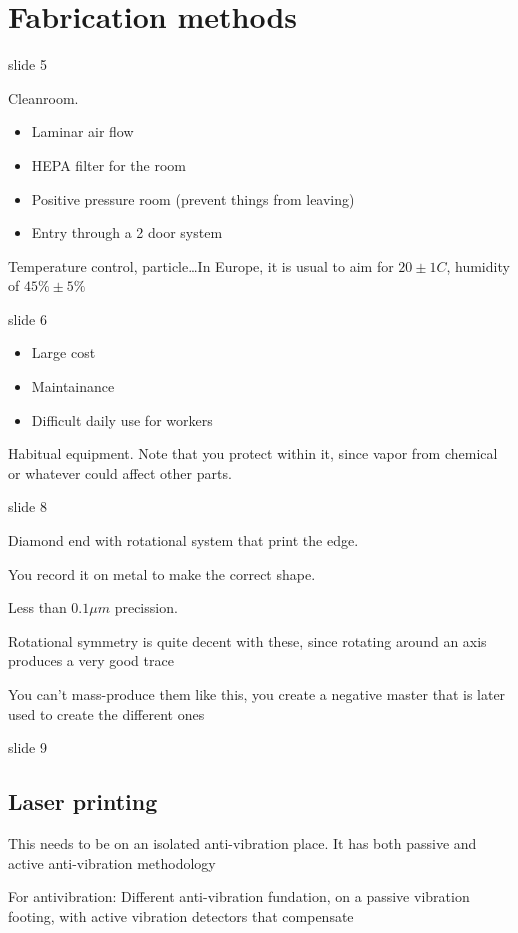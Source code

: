 \documentclass[../main/main.tex]{subfiles}
\begin{document}
\chapter{Fabrication methods}

slide 5

Cleanroom.

\begin{itemize}
	\item Laminar air flow
	\item HEPA filter for the room
	\item Positive pressure room (prevent things from leaving)
	\item Entry through a 2 door system
\end{itemize}

Temperature control, particle\ldots In Europe, it is usual to aim for $20\pm 1 C$, humidity of $45\%\pm5\%$

slide 6

\begin{itemize}
	\item Large cost
	\item Maintainance
	\item Difficult daily use for workers
\end{itemize}

Habitual equipment. Note that you protect within it, since vapor from chemical or whatever could affect other parts.

slide 8

Diamond end with rotational system that print the edge.

You record it on metal to make the correct shape.

Less than $0.1 \mu m$ precission.

Rotational symmetry is quite decent with these, since rotating around an axis produces a very good trace

You can't mass-produce them like this, you create a negative master that is later used to create the different ones



slide 9

\section{Laser printing}

This needs to be on an isolated anti-vibration place. It has both passive and active anti-vibration methodology

For antivibration: Different anti-vibration fundation, on a passive vibration footing, with active vibration detectors that compensate
\end{document}
